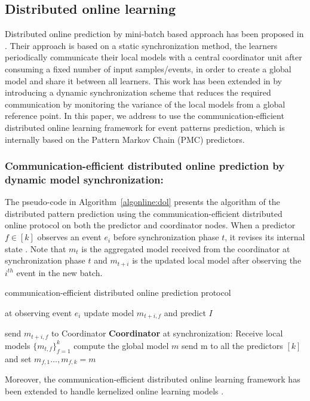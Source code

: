 \subsection{Distributed online learning}

Distributed online prediction by mini-batch based approach has been proposed in \cite{dekel2012optimal}. Their approach is based on a static synchronization method,  the learners periodically communicate  their local models with a central coordinator unit after consuming a fixed number of input samples/events, in order to  create a global model and share it between all learners. This work has been extended in \cite{kamp2014communication} by introducing a
dynamic synchronization scheme that reduces the required communication by monitoring the variance of the local models from a global reference point. In this paper, we address to use the communication-efficient distributed online learning framework for event patterns prediction, which is internally based on the Pattern Markov Chain (PMC) predictors. 
\subsubsection*{Communication-efficient distributed online prediction by dynamic model synchronization:}

The pseudo-code in Algorithm~\ref{algonline:dol} presents the algorithm of the distributed pattern prediction using the communication-efficient distributed online protocol on both the predictor and coordinator nodes. When a predictor $f\in[k]$ observes an event $e_i$ before synchronization phase $t$, it revises its internal state . Note that $m_t$ is the aggregated model received from the coordinator at synchronization phase $t$ and $m_{t+i}$ is the updated local model after observing the $i^{th}$ event in the new batch.

\begin{algorithm}
	\caption{communication-efficient distributed online prediction protocol} 
	\begin{algorithmic}[1] 
		 at observing event $e_i$
		\Statex \Indp update model $m_{t+i,f}$ and predict $I$

		\Statex {}  
		\Statex send $m_{t+i,f}$ to Coordinator 
		\Statex \Indm \Indm \textbf{Coordinator} at synchronization:
		\Statex \Indp Receive local models $\{m_{t,f}\}_{f=1}^k$ 	
		\Statex  compute the global model $m$ 
		\Statex send m to all the predictors $[k]$ and set $m_{f,1}\dots, m_{f,k}=m$
	\end{algorithmic}
	\label{algonline:dos}
\end{algorithm}


Moreover, the communication-efficient distributed online learning framework has been extended to handle kernelized online learning models \cite{kamp2016communication}.
